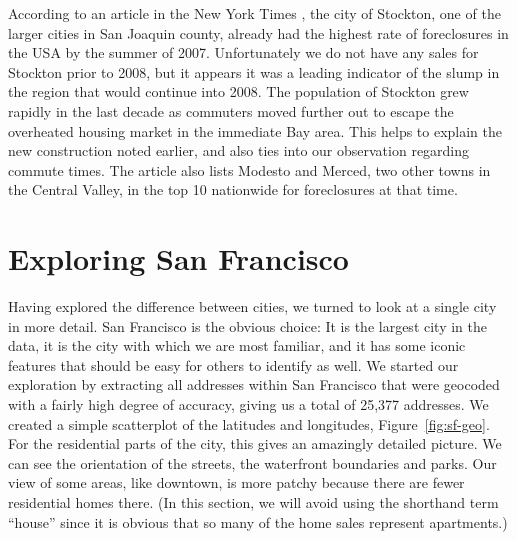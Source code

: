 \documentclass[oneside]{article}
\begin{document}
According to an article in the New York Times \citep{mckinley:2007}, the city of Stockton, one of the larger cities in San Joaquin county, already had the highest rate of foreclosures in the USA by the summer of 2007. Unfortunately we do not have any sales for Stockton prior to 2008, but it appears it was a leading indicator of the slump in the region that would continue into 2008. The population of Stockton grew rapidly in the last decade as commuters moved further out to escape the overheated housing market in the immediate Bay area. This helps to explain the new construction noted earlier, and also ties into our observation regarding commute times. The article also lists Modesto and Merced, two other towns in the Central Valley, in the top 10 nationwide for foreclosures at that time.   


\section{Exploring San Francisco}

Having explored the difference between cities, we turned to look at a single city in more detail.  San Francisco is the obvious choice:  It is the largest city in the data, it is the city with which we are most familiar, and it has some iconic features that should be easy for others to identify as well.  We started our exploration by extracting all addresses within San Francisco that were geocoded with a fairly high degree of accuracy, giving us a total of 25,377 addresses.  We created a simple scatterplot of the latitudes and longitudes, Figure~\ref{fig:sf-geo}.  For the residential parts of the city, this gives an amazingly detailed picture.  We can see the orientation of the streets, the waterfront boundaries and parks.  Our view of some areas, like downtown, is more patchy because there are fewer residential homes there.  (In this section, we will avoid using the shorthand term ``house'' since it is obvious that so many of the home sales represent apartments.)
\end{document}

